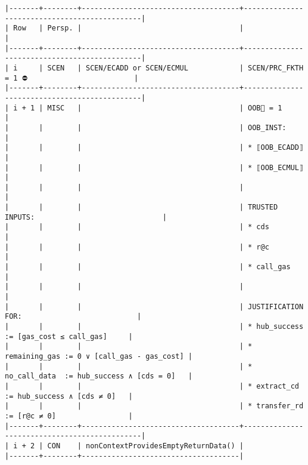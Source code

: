 \documentclass[varwidth=\maxdimen,margin=0.5cm,multi={verbatim}]{standalone}
\begin{document}
\begin{verbatim}
|-------+--------+-------------------------------------+----------------------------------------------|
| Row   | Persp. |                                     |                                              |
|-------+--------+-------------------------------------+----------------------------------------------|
| i     | SCEN   | SCEN/ECADD or SCEN/ECMUL            | SCEN/PRC_FKTH = 1 ⛔                         |
|-------+--------+-------------------------------------+----------------------------------------------|
| i + 1 | MISC   |                                     | OOB🚩 = 1                                    |
|       |        |                                     | OOB_INST:                                    |
|       |        |                                     | * ⟦OOB_ECADD⟧                                |
|       |        |                                     | * ⟦OOB_ECMUL⟧                                |
|       |        |                                     |                                              |
|       |        |                                     | TRUSTED INPUTS:                              |
|       |        |                                     | * cds                                        |
|       |        |                                     | * r@c                                        |
|       |        |                                     | * call_gas                                   |
|       |        |                                     |                                              |
|       |        |                                     | JUSTIFICATION FOR:                           |
|       |        |                                     | * hub_success   := [gas_cost ≤ call_gas]     |
|       |        |                                     | * remaining_gas := 0 ∨ [call_gas - gas_cost] |
|       |        |                                     | * no_call_data  := hub_success ∧ [cds = 0]   |
|       |        |                                     | * extract_cd    := hub_success ∧ [cds ≠ 0]   |
|       |        |                                     | * transfer_rd   := [r@c ≠ 0]                 |
|-------+--------+-------------------------------------+----------------------------------------------|
| i + 2 | CON    | nonContextProvidesEmptyReturnData() |
|-------+--------+-------------------------------------|
\end{verbatim}
\end{document}

